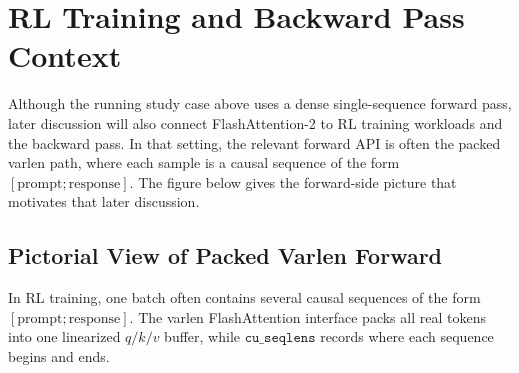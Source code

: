 \documentclass[11pt]{article}
\begin{document}
\section{RL Training and Backward Pass Context}

Although the running study case above uses a dense single-sequence forward
pass, later discussion will also connect FlashAttention-2 to RL training
workloads and the backward pass. In that setting, the relevant forward API is
often the packed varlen path, where each sample is a causal sequence of the
form $[\text{prompt};\text{response}]$. The figure below gives the forward-side
picture that motivates that later discussion.

\subsection{Pictorial View of Packed Varlen Forward}

In RL training, one batch often contains several causal sequences of the form
$[\text{prompt};\text{response}]$. The varlen FlashAttention interface packs all
real tokens into one linearized $q/k/v$ buffer, while $\texttt{cu\_seqlens}$ records
where each sequence begins and ends.
\end{document}
